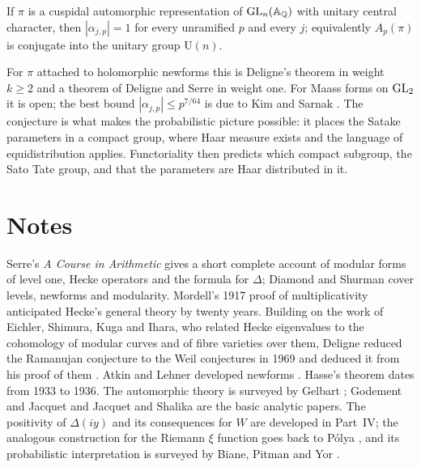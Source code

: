 \begin{conjecture}\label{conj:02ramanujan}
If $\pi$ is a cuspidal automorphic representation of $\mathrm{GL}_n(\mathbb{A}_{\mathbb{Q}})$ with unitary central character, then $|\alpha_{j,p}|=1$ for every unramified $p$ and every $j$; equivalently $A_p(\pi)$ is conjugate into the unitary group $\mathrm U(n)$.
\end{conjecture}

For $\pi$ attached to holomorphic newforms this is Deligne's theorem \cite{deligne1974} in weight $k\ge2$ and a theorem of Deligne and Serre \cite{deligneserre1974} in weight one. For Maass forms on $\mathrm{GL}_2$ it is open; the best bound $|\alpha_{j,p}|\le p^{7/64}$ is due to Kim and Sarnak \cite{kimsarnak2003}. The conjecture is what makes the probabilistic picture possible: it places the Satake parameters in a compact group, where Haar measure exists and the language of equidistribution applies. Functoriality then predicts which compact subgroup, the Sato Tate group, and that the parameters are Haar distributed in it.

\section{Notes}

Serre's \emph{A Course in Arithmetic} \cite{serre1973} gives a short complete account of modular forms of level one, Hecke operators and the formula for $\Delta$; Diamond and Shurman \cite{diamondshurman2005} cover levels, newforms and modularity. Mordell's 1917 proof of multiplicativity \cite{mordell1917} anticipated Hecke's general theory \cite{hecke1937} by twenty years. Building on the work of Eichler, Shimura, Kuga and Ihara, who related Hecke eigenvalues to the cohomology of modular curves and of fibre varieties over them, Deligne reduced the Ramanujan conjecture to the Weil conjectures in 1969 \cite{deligne1971} and deduced it from his proof of them \cite{deligne1974}. Atkin and Lehner developed newforms \cite{atkinlehner1970}. Hasse's theorem dates from 1933 to 1936. The automorphic theory is surveyed by Gelbart \cite{gelbart1984}; Godement and Jacquet \cite{godementjacquet1972} and Jacquet and Shalika \cite{jacquetshalika1981} are the basic analytic papers. The positivity of $\Delta(iy)$ and its consequences for $W$ are developed in Part~IV; the analogous construction for the Riemann $\xi$ function goes back to P\'olya \cite{polya1926}, and its probabilistic interpretation is surveyed by Biane, Pitman and Yor \cite{bpy2001}.

